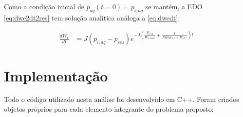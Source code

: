 \documentclass[final,5p]{elsarticle}
\numberwithin{equation}{section}
\begin{document}
        Como a condição inicial de $p_{aq}(t=0)=p_{i,aq}$ se mantém, a EDO \ref{eq:dwe2dt2res} tem solução analítica análoga a \ref{eq:dwedt}:

        \begin{align}
            \frac{dW_e}{dt} &= J (p_{i,aq} - p_{res}) e^{-J \left( \frac{p_{i,aq}}{W_{e,max}} + \frac{1}{N Bo_b c_{o,b} + Pv_i c_r} \right)  t} \label{eq:dwedtres}
        \end{align}

\section{Implementação} \label{sec:implementacao}

        Todo o código utilizado nesta análise foi desenvolvido em C++. Foram criados objetos próprios para cada elemento integrante do problema proposto:
\end{document}
